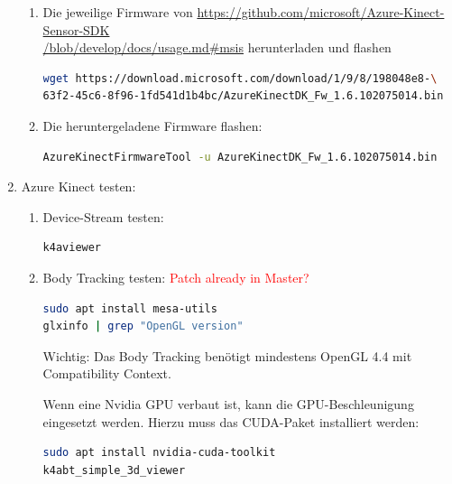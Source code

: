 \begin{enumerate}[label*=\arabic*.]
\begin{enumerate}[label*=\arabic*.]
            \item Die jeweilige Firmware von \href{https://github.com/microsoft/Azure-Kinect-Sensor-SDK/blob/develop/docs/usage.md#msis}{https://github.com/microsoft/Azure-Kinect-Sensor-SDK\\/blob/develop/docs/usage.md\#msis} herunterladen und flashen
                \begin{lstlisting}[language=bash]
wget https://download.microsoft.com/download/1/9/8/198048e8-\
63f2-45c6-8f96-1fd541d1b4bc/AzureKinectDK_Fw_1.6.102075014.bin
                \end{lstlisting}

            \item Die heruntergeladene Firmware flashen:
                \begin{lstlisting}[language=bash]
AzureKinectFirmwareTool -u AzureKinectDK_Fw_1.6.102075014.bin
                \end{lstlisting}
        \end{enumerate}

    \item Azure Kinect testen:
        \begin{enumerate}[label*=\arabic*.]
            \item Device-Stream testen:
                \begin{lstlisting}[language=bash]
k4aviewer
                \end{lstlisting}

            \item Body Tracking testen: \textcolor{red}{Patch already in Master?}
                \begin{lstlisting}[language=bash]
sudo apt install mesa-utils
glxinfo | grep "OpenGL version"
                \end{lstlisting}

                \begin{redbox}{Wichtig:}
                    Das Body Tracking benötigt mindestens OpenGL 4.4 mit Compatibility Context.
                \end{redbox}

                Wenn eine Nvidia GPU verbaut ist, kann die GPU-Beschleunigung eingesetzt werden. Hierzu muss das CUDA-Paket installiert werden:
                \begin{lstlisting}[language=bash]
sudo apt install nvidia-cuda-toolkit
k4abt_simple_3d_viewer
                \end{lstlisting}


\end{enumerate}
\end{enumerate}
